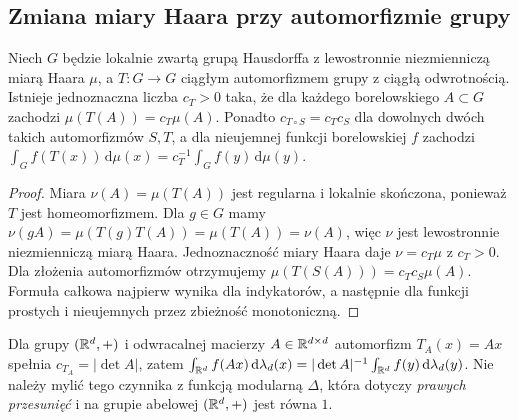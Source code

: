 \subsection*{Zmiana miary Haara przy automorfizmie grupy}
\begin{twierdzenie}\label{tw:haar-automorfizm}
Niech $G$ będzie lokalnie zwartą grupą Hausdorffa z lewostronnie niezmienniczą miarą Haara $\mu$, a $T:G\to G$ ciągłym automorfizmem grupy z ciągłą odwrotnością. Istnieje jednoznaczna liczba $c_T>0$ taka, że dla każdego borelowskiego $A\subset G$ zachodzi $\mu(T(A))=c_T\mu(A)$. Ponadto $c_{T\circ S}=c_Tc_S$ dla dowolnych dwóch takich automorfizmów $S,T$, a dla nieujemnej funkcji borelowskiej $f$ zachodzi
$\int_G f(T(x))\,\mathrm d\mu(x)=c_T^{-1}\int_Gf(y)\,\mathrm d\mu(y)$.
\end{twierdzenie}
\begin{proof}
Miara $\nu(A)=\mu(T(A))$ jest regularna i lokalnie skończona, ponieważ $T$ jest homeomorfizmem. Dla $g\in G$ mamy $\nu(gA)=\mu(T(g)T(A))=\mu(T(A))=\nu(A)$, więc $\nu$ jest lewostronnie niezmienniczą miarą Haara. Jednoznaczność miary Haara daje $\nu=c_T\mu$ z $c_T>0$. Dla złożenia automorfizmów otrzymujemy $\mu(T(S(A)))=c_Tc_S\mu(A)$. Formuła całkowa najpierw wynika dla indykatorów, a następnie dla funkcji prostych i nieujemnych przez zbieżność monotoniczną.
\end{proof}
\begin{przyklad}
Dla grupy $(\mathbb R^d,+)$ i odwracalnej macierzy $A\in\mathbb R^{d\times d}$ automorfizm $T_A(x)=Ax$ spełnia $c_{T_A}=|\det A|$, zatem
$\int_{\mathbb R^d}f(Ax)\,\mathrm d\lambda_d(x)=|\det A|^{-1}\int_{\mathbb R^d}f(y)\,\mathrm d\lambda_d(y)$. Nie należy mylić tego czynnika z funkcją modularną $\Delta$, która dotyczy \emph{prawych przesunięć} i na grupie abelowej $(\mathbb R^d,+)$ jest równa $1$.
\end{przyklad}

